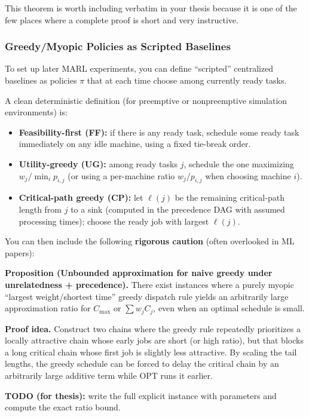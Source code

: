 This theorem is worth including verbatim in your thesis because it is one of the few places where a complete proof is short and very instructive.

\subsubsection{Greedy/Myopic Policies as Scripted Baselines}

To set up later MARL experiments, you can define ``scripted'' centralized baselines as policies \(\pi\) that at each time choose among currently ready tasks.

A clean deterministic definition (for preemptive or nonpreemptive simulation environments) is:

\begin{itemize}
\item \textbf{Feasibility-first (FF):} if there is any ready task, schedule some ready task immediately on any idle machine, using a fixed tie-break order.
\item \textbf{Utility-greedy (UG):} among ready tasks \(j\), schedule the one maximizing \(w_j / \min_i p_{i,j}\) (or using a per-machine ratio \(w_j/p_{i,j}\) when choosing machine \(i\)).
\item \textbf{Critical-path greedy (CP):} let \(\ell(j)\) be the remaining critical-path length from \(j\) to a sink (computed in the precedence DAG with assumed processing times); choose the ready job with largest \(\ell(j)\).
\end{itemize}

You can then include the following \textbf{rigorous caution} (often overlooked in ML papers):

\textbf{Proposition (Unbounded approximation for naive greedy under unrelatedness + precedence).} There exist instances where a purely myopic ``largest weight/shortest time'' greedy dispatch rule yields an arbitrarily large approximation ratio for \(C_{\max}\) or \(\sum w_j C_j\), even when an optimal schedule is small.

\textbf{Proof idea.} Construct two chains where the greedy rule repeatedly prioritizes a locally attractive chain whose early jobs are short (or high ratio), but that blocks a long critical chain whose first job is slightly less attractive. By scaling the tail lengths, the greedy schedule can be forced to delay the critical chain by an arbitrarily large additive term while OPT runs it earlier.

\textbf{TODO (for thesis):} write the full explicit instance with parameters and compute the exact ratio bound.

